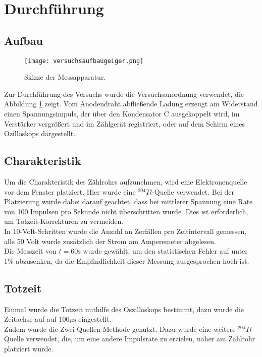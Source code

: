\section{Durchführung}
\label{sec:Durchführung}

\subsection{Aufbau}
\begin{figure}
 \centering
 \texttt{[image: versuchsaufbaugeiger.png]}
 \label{fig:aufbauversuch}
 \caption{Skizze der Messapparatur.}
\end{figure}

\noindent Zur Durchführung des Versuchs wurde die Versuchsanordnung verwendet,
die Abbildung \ref{fig:aufbauversuch} zeigt. Vom Anodendraht abfließende Ladung
erzeugt am Widerstand einen Spannungsimpuls, der über den Kondensator C ausgekoppelt wird,
im Verstärker vergrößert und im Zählgerät registriert, oder auf dem Schirm
eines Ozilloskops dargestellt.\\

\subsection{Charakteristik}
Um die Charakteristik des Zählrohrs aufzunehmen, wird eine Elektronenquelle vor dem
Fenster platziert. Hier wurde eine $^204Tl$-Quelle verwendet. Bei der Platzierung
wurde dabei darauf geachtet, dass bei mittlerer Spannung eine Rate von
100 Impulsen pro Sekunde nicht überschritten wurde. Dies ist erforderlich,
um Totzeit-Korrekturen zu vermeiden. \\
In 10-Volt-Schritten wurde die Anzahl an Zerfällen pro Zeitintervall gemessen, alle 
50 Volt wurde zusätzlich der Strom am Amperemeter abgelesen.\\
Die Messzeit von $t = 60\si{\s}$ wurde gewählt, um den statistischen Fehler
auf unter 1\% abzusenken, da die Empfindlichkeit dieser Messung ausgesprochen
hoch ist. 

\subsection{Totzeit}
Einmal wurde die Totzeit mithilfe des Oszilloskops bestimmt, dazu wurde 
die Zeitachse auf auf $100 \si{\micro\s}$ eingestellt.\\
Zudem wurde die Zwei-Quellen-Methode genutzt. Dazu wurde eine weitere
$^204 Tl$-Quelle verwendet, die, um eine andere Impulsrate zu erzielen,
näher am Zählrohr platziert wurde. 
